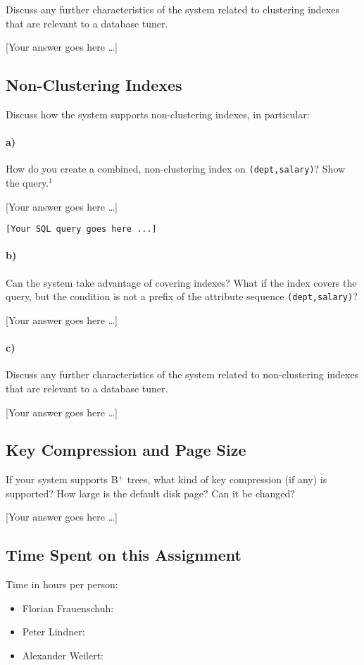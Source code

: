 \documentclass[11pt]{scrartcl}
\newcommand{\youranswerhere}{[Your answer goes here \ldots]}
\begin{document}
Discuss any further characteristics of the system related to clustering indexes that are relevant to a database tuner.

\youranswerhere{}

\subsection{Non-Clustering Indexes}

Discuss how the system supports non-clustering indexes, in particular:

\paragraph{a)}

How do you create a combined, non-clustering index on \texttt{(dept,salary)}? Show the query.$^1$

\youranswerhere{}

\begin{lstlisting}[style=dbtsql]
[Your SQL query goes here ...]
\end{lstlisting}

\paragraph{b)}

Can the system take advantage of covering indexes? What if the index covers the query, but the condition is not a prefix of the attribute sequence \texttt{(dept,salary)}?

\youranswerhere{}

\paragraph{c)}

Discuss any further characteristics of the system related to non-clustering indexes that are relevant to a database tuner.

\youranswerhere{}

\subsection{Key Compression and Page Size}

If your system supports B$^+$ trees, what kind of key compression (if any) is supported? How large is the default disk page? Can it be changed?

\youranswerhere{}

\subsection*{Time Spent on this Assignment}

Time in hours per person:
\begin{itemize}
  \item Florian Frauenschuh: \textbf{}
  \item Peter Lindner: \textbf{}
  \item Alexander Weilert: \textbf{}
\end{itemize}

\pagebreak

\printbibliography[title=References]
\end{document}

